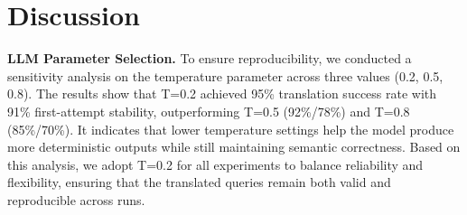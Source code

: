 \documentclass[sigconf,review,anonymous]{acmart}
\begin{document}
\section{Discussion}
\label{sec:discussion}



\textbf{LLM Parameter Selection. } \label{sec:llm-params}
To ensure reproducibility, we conducted a sensitivity analysis on the temperature parameter across three values (0.2, 0.5, 0.8). 
The results show that
T=0.2 achieved 95\% translation success rate with 91\% first-attempt stability, outperforming T=0.5 (92\%/78\%) and T=0.8 (85\%/70\%). 
It indicates that lower temperature settings help the model produce more deterministic outputs while still maintaining semantic correctness. 
Based on this analysis, we adopt T=0.2 for all experiments to balance reliability and flexibility, ensuring that the translated queries remain both valid and reproducible across runs.
\end{document}
